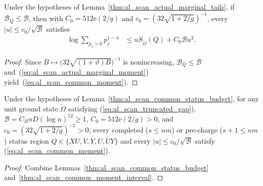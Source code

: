 \begin{lemma}
    \label{thm:al_scan_common_moment_interval}
    Under the hypotheses of Lemma~\ref{thm:al_scan_actual_marginal_tails}, if
    $\mathcal B_Q\le\mathcal B$, then with $C_0=512\mathrm e(2/g)$ and
    $c_0=(32\sqrt{1+2/g})^{-1}$, every $|u|\le c_0/\sqrt{\mathcal B}$ satisfies
    \begin{align}
        \log\sum_{p_j>0}p_j^{1-u} & \le uS_{\widetilde\Omega}(Q)+C_0\mathcal B u^2.
        \label{eq:al_scan_common_moment}
    \end{align}
\end{lemma}
\begin{proof}
    Since $B\mapsto\bigl(32\sqrt{(1+\vartheta)B}\bigr)^{-1}$ is nonincreasing,
    $\mathcal B_Q\le\mathcal B$ and~(\ref{eq:al_scan_actual_marginal_moment})
    yield~(\ref{eq:al_scan_common_moment}).
\end{proof}

\begin{lemma}
    \label{thm:al_scan_supplied_status_moments}
    \leanok
    Under the hypotheses of Lemma~\ref{thm:al_scan_common_status_budget}, for
    any unit ground state $\widetilde\Omega$ satisfying
    (\ref{eq:al_scan_truncated_gap}), $\mathcal B=C_BnD(\log n)^{12}\ge1$,
    $C_0=512\mathrm e(2/g)>0$, and $c_0=(32\sqrt{1+2/g})^{-1}>0$, every
    completed ($s\le nm$) or pre-charge ($s+1\le nm$) status region
    $Q\in\{XU,V,Y,U,UY\}$ and every $|u|\le c_0/\sqrt{\mathcal B}$ satisfy
    (\ref{eq:al_scan_common_moment}).
\end{lemma}
\begin{proof}\leanok
    Combine Lemmas~\ref{thm:al_scan_common_status_budget}
    and~\ref{thm:al_scan_common_moment_interval}.
\end{proof}

